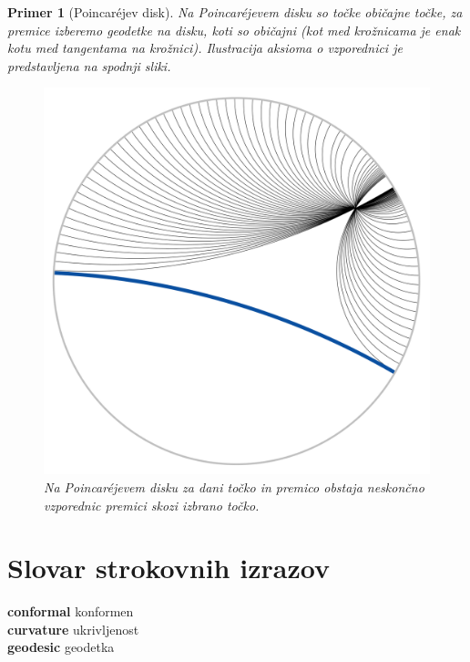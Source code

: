 \documentclass[a4paper]{article}
\newtheorem{primer}{Primer}
\newcommand{\geslo}[2]{\noindent\textbf{#1} \quad \hangindent=1cm #2\\[-1pc]}
\begin{document}
\begin{primer}[Poincar\'ejev disk]
Na Poincar\'ejevem disku so točke običajne točke, za premice izberemo geodetke na disku, koti so običajni (kot med krožnicama je enak kotu med tangentama na krožnici). Ilustracija aksioma o vzporednici je predstavljena na spodnji sliki.
%
\begin{figure}[h!]
\begin{center}
\includegraphics[scale=0.115]{poincare-disk-5aksiom.png}
\caption{Na Poincar\'ejevem disku za dani točko in premico obstaja neskončno vzporednic premici skozi izbrano točko.~\cite[vir slike]{hypGeom-wiki}}
\end{center}
\end{figure}
%
\end{primer}

\section*{Slovar strokovnih izrazov}

\geslo{conformal}{konformen}

\geslo{curvature}{ukrivljenost}

\geslo{geodesic}{geodetka}
\end{document}
